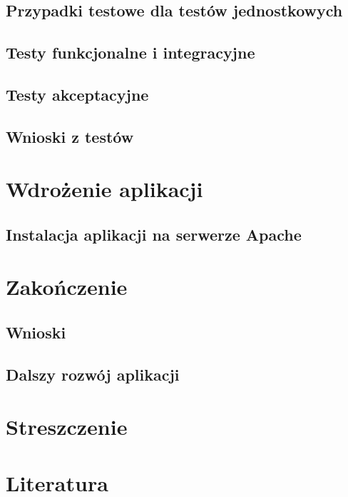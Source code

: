 \documentclass[12pt,twoside,a4paper]{article}
\begin{document}
	\subsection{Przypadki testowe dla testów jednostkowych}\label{sec:przypadki_testowe}
	\subsection{Testy funkcjonalne i integracyjne}\label{sec:testy_funkcjonalne}
	\subsection{Testy akceptacyjne}
	\subsection{Wnioski z testów}\label{sec:testy_wnioski}
\newpage	
\section{Wdrożenie aplikacji}
	\subsection{Instalacja aplikacji na serwerze Apache}
\newpage	
\section{Zakończenie}
  
  \subsection{Wnioski}

  \subsection{Dalszy rozwój aplikacji}


\newpage
\section{Streszczenie}







\section*{Literatura}\label{sec:literatura}



%
\end{document}
